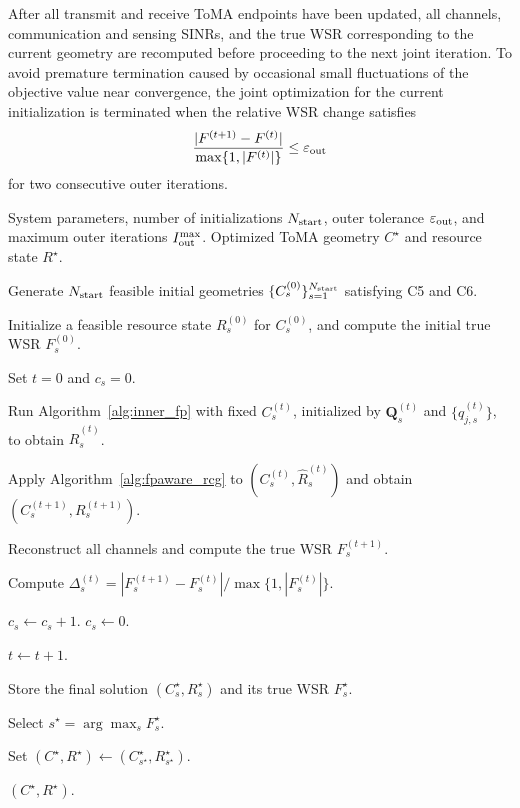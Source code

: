 \documentclass[letterpaper,journal]{IEEEtran}
\begin{document}
After all transmit and receive ToMA endpoints have been updated, all channels, communication and sensing SINRs, and the true WSR corresponding to the current geometry are recomputed before proceeding to the next joint iteration. To avoid premature termination caused by occasional small fluctuations of the objective value near convergence, the joint optimization for the current initialization is terminated when the relative WSR change satisfies
\begin{equation}
\frac{
|F^{(t+1)}-F^{(t)}|
}{
\max\{1,|F^{(t)}|\}
}
\le
\varepsilon_{\rm out}
\label{eq:outer_stop}
\end{equation}
for two consecutive outer iterations.
\begin{algorithm}[t]
\caption{Overall Joint Alternating Optimization}
\label{alg:overall_joint}
\begin{algorithmic}[1]

\REQUIRE System parameters, number of initializations $N_{\rm start}$,
outer tolerance $\varepsilon_{\rm out}$, and maximum outer
iterations $I_{\rm out}^{\max}$.
\ENSURE Optimized ToMA geometry $C^\star$ and resource state $R^\star$.

    \STATE Generate $N_{\rm start}$ feasible initial geometries
    $\{C_s^{(0)}\}_{s=1}^{N_{\rm start}}$ satisfying C5 and C6.

    \STATE Initialize a feasible resource state $R_s^{(0)}$ for
    $C_s^{(0)}$, and compute the initial true WSR $F_s^{(0)}$.

    \STATE Set $t=0$ and $c_s=0$.

    \REPEAT

        \STATE Run Algorithm~\ref{alg:inner_fp} with fixed
        $C_s^{(t)}$, initialized by $\mathbf Q_s^{(t)}$ and
        $\{q_{j,s}^{(t)}\}$, to obtain $\widehat{R}_s^{(t)}$.

        \STATE Apply Algorithm~\ref{alg:fpaware_rcg} to
        $(C_s^{(t)},\widehat R_s^{(t)})$ and obtain
        $(C_s^{(t+1)},R_s^{(t+1)})$.

        \STATE Reconstruct all channels and compute the true WSR
        $F_s^{(t+1)}$.

        \STATE Compute
        $\Delta_s^{(t)}
        =
        |F_s^{(t+1)}-F_s^{(t)}|
        /\max\{1,|F_s^{(t)}|\}$.

            \STATE $c_s\leftarrow c_s+1$.
        \ELSE
            \STATE $c_s\leftarrow0$.
        \ENDIF

        \STATE $t\leftarrow t+1$.

    \STATE Store the final solution
    $(C_s^\star,R_s^\star)$ and its true WSR $F_s^\star$.
\ENDFOR

\STATE Select
$s^\star=\arg\max_{s}F_s^\star$.

\STATE Set
$(C^\star,R^\star)
\leftarrow
(C_{s^\star}^\star,R_{s^\star}^\star)$.

\RETURN $(C^\star,R^\star)$.

\end{algorithmic}
\end{algorithm}
\end{document}
